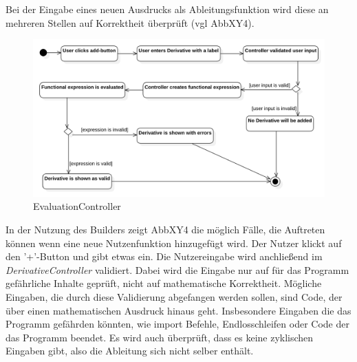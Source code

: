 \documentclass{article}
\begin{document}
\begin{itemize}
Bei der Eingabe eines neuen Ausdrucks als Ableitungsfunktion wird diese an mehreren Stellen auf Korrektheit überprüft (vgl AbbXY4). 
\begin{figure}[H]%
    \centering
    \includegraphics[width=13cm]{entwurf/Floriane/AktivityAddDerivative.png}
    \caption{EvaluationController}
\end{figure}
In der Nutzung des Builders zeigt AbbXY4 die möglich Fälle, die Auftreten können wenn eine neue Nutzenfunktion hinzugefügt wird. Der Nutzer klickt auf den '+'-Button und gibt etwas ein. Die Nutzereingabe wird anchließend im \textit{DerivativeController} validiert. Dabei wird die Eingabe nur auf für das Programm gefährliche Inhalte geprüft, nicht auf mathematische Korrektheit. Mögliche Eingaben, die durch diese Validierung abgefangen werden sollen, sind Code, der über einen mathematischen Ausdruck hinaus geht. Insbesondere Eingaben die das Programm gefährden könnten, wie import Befehle, Endlosschleifen oder Code der das Programm beendet. Es wird auch überprüft, dass es keine zyklischen Eingaben gibt, also die Ableitung sich nicht selber enthält.


\end{itemize}
\end{document}
